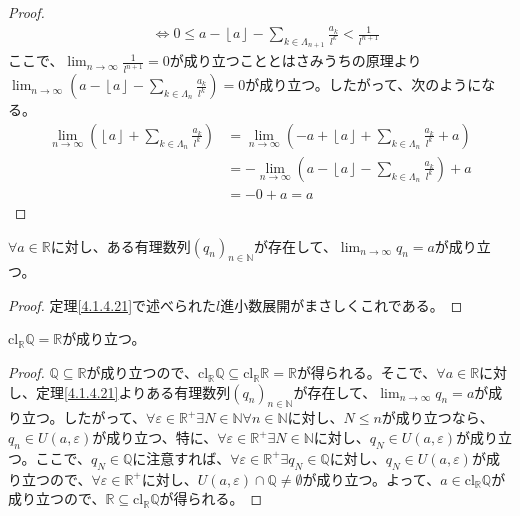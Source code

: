 \documentclass[dvipdfmx]{jsarticle}
\begin{document}
\begin{proof}
\begin{align*}
&\Leftrightarrow 0 \leq a - \left\lfloor a \right\rfloor - \sum_{k \in \varLambda_{n + 1}} \frac{a_{k}}{l^{k}} < \frac{1}{l^{n + 1}}
\end{align*}
ここで、$\lim_{n \rightarrow \infty}\frac{1}{l^{n + 1}} = 0$が成り立つこととはさみうちの原理より$\lim_{n \rightarrow \infty}\left( a - \left\lfloor a \right\rfloor - \sum_{k \in \varLambda_{n}} \frac{a_{k}}{l^{k}} \right) = 0$が成り立つ。したがって、次のようになる。
\begin{align*}
\lim_{n \rightarrow \infty}\left( \left\lfloor a \right\rfloor + \sum_{k \in \varLambda_{n}} \frac{a_{k}}{l^{k}} \right) &= \lim_{n \rightarrow \infty}\left( - a + \left\lfloor a \right\rfloor + \sum_{k \in \varLambda_{n}} \frac{a_{k}}{l^{k}} + a \right)\\
&= - \lim_{n \rightarrow \infty}\left( a - \left\lfloor a \right\rfloor - \sum_{k \in \varLambda_{n}} \frac{a_{k}}{l^{k}} \right) + a\\
&= - 0 + a = a
\end{align*}
\end{proof}
\begin{thm}\label{4.1.4.22}
$\forall a \in \mathbb{R}$に対し、ある有理数列$\left( q_{n} \right)_{n \in \mathbb{N}}$が存在して、$\lim_{n \rightarrow \infty}q_{n} = a$が成り立つ。
\end{thm}
\begin{proof} 定理\ref{4.1.4.21}で述べられた$l$進小数展開がまさしくこれである。
\end{proof}
\begin{thm}\label{4.1.4.23} $\mathrm{cl}_{\mathbb{R}}\mathbb{Q} = \mathbb{R}$が成り立つ。
\end{thm}
\begin{proof}
$\mathbb{Q} \subseteq \mathbb{R}$が成り立つので、$\mathrm{cl}_{\mathbb{R}}\mathbb{Q} \subseteq \mathrm{cl}_{\mathbb{R}}\mathbb{R} = \mathbb{R}$が得られる。そこで、$\forall a \in \mathbb{R}$に対し、定理\ref{4.1.4.21}よりある有理数列$\left( q_{n} \right)_{n \in \mathbb{N}}$が存在して、$\lim_{n \rightarrow \infty}q_{n} = a$が成り立つ。したがって、$\forall\varepsilon \in \mathbb{R}^{+}\exists N \in \mathbb{N}\forall n \in \mathbb{N}$に対し、$N \leq n$が成り立つなら、$q_{n} \in U(a,\varepsilon)$が成り立つ、特に、$\forall\varepsilon \in \mathbb{R}^{+}\exists N \in \mathbb{N}$に対し、$q_{N} \in U(a,\varepsilon)$が成り立つ。ここで、$q_{N} \in \mathbb{Q}$に注意すれば、$\forall\varepsilon \in \mathbb{R}^{+}\exists q_{N} \in \mathbb{Q}$に対し、$q_{N} \in U(a,\varepsilon)$が成り立つので、$\forall\varepsilon \in \mathbb{R}^{+}$に対し、$U(a,\varepsilon) \cap \mathbb{Q} \neq \emptyset$が成り立つ。よって、$a \in \mathrm{cl}_{\mathbb{R}}\mathbb{Q}$が成り立つので、$\mathbb{R} \subseteq \mathrm{cl}_{\mathbb{R}}\mathbb{Q}$が得られる。
\end{proof}
\end{document}
